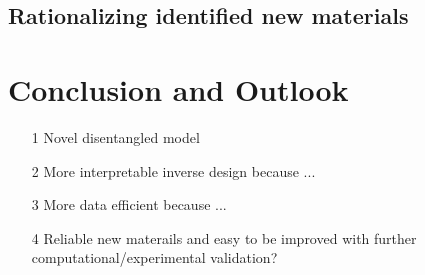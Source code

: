 \documentclass[a4paper]{article}
\begin{document}
\subsection{Rationalizing identified new materials}

\section{Conclusion and Outlook}

\begin{enumerate}
    \item[1] Novel disentangled model
    \item[2] More interpretable inverse design because ...
    \item[3] More data efficient because ...
    \item[4] Reliable new materails and easy to be improved with further computational/experimental validation?

\end{enumerate}



\end{document}
